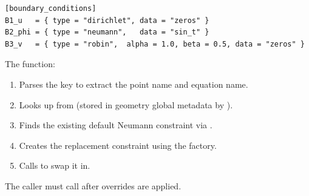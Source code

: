 \begin{lstlisting}[caption={Boundary override TOML format}]
[boundary_conditions]
B1_u   = { type = "dirichlet", data = "zeros" }
B2_phi = { type = "neumann",   data = "sin_t" }
B3_v   = { type = "robin",  alpha = 1.0, beta = 0.5, data = "zeros" }
\end{lstlisting}

\noindent The function:
\begin{enumerate}
  \item Parses the key to extract the point name and equation name.
  \item Looks up  from  (stored in geometry global metadata by ).
  \item Finds the existing default Neumann constraint via .
  \item Creates the replacement constraint using the  factory.
  \item Calls  to swap it in.
\end{enumerate}

The caller must call  after overrides are applied.

